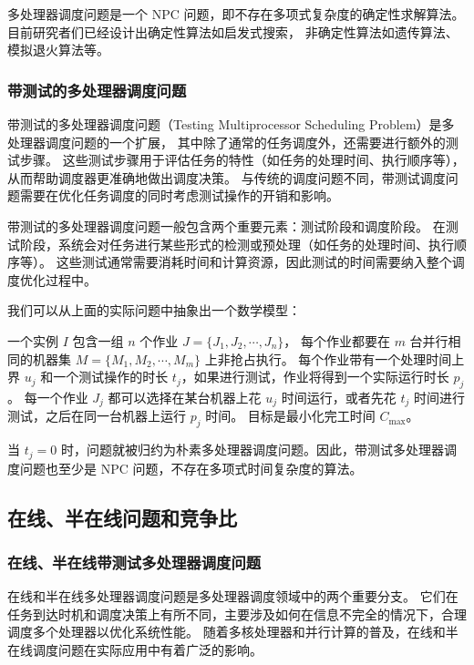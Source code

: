 多处理器调度问题是一个 NPC 问题，即不存在多项式复杂度的确定性求解算法。
目前研究者们已经设计出确定性算法如启发式搜索，
非确定性算法如遗传算法、模拟退火算法等。

\subsubsection{带测试的多处理器调度问题}

带测试的多处理器调度问题（Testing Multiprocessor Scheduling Problem）是多处理器调度问题的一个扩展，
其中除了通常的任务调度外，还需要进行额外的测试步骤。
这些测试步骤用于评估任务的特性（如任务的处理时间、执行顺序等），从而帮助调度器更准确地做出调度决策。
与传统的调度问题不同，带测试调度问题需要在优化任务调度的同时考虑测试操作的开销和影响。

带测试的多处理器调度问题一般包含两个重要元素：测试阶段和调度阶段。
在测试阶段，系统会对任务进行某些形式的检测或预处理（如任务的处理时间、执行顺序等）。
这些测试通常需要消耗时间和计算资源，因此测试的时间需要纳入整个调度优化过程中。

我们可以从上面的实际问题中抽象出一个数学模型：

\begin{defi}[带测试多处理器调度问题]
    一个实例 $I$ 包含一组 $n$ 个作业 $J = \{J_1, J_2, \cdots, J_n\}$，
    每个作业都要在 $m$ 台并行相同的机器集 $M = \{M_1, M_2, \cdots, M_m\}$ 上非抢占执行。
    每个作业带有一个处理时间上界 $u_j$ 和一个测试操作的时长 $t_j$，如果进行测试，作业将得到一个实际运行时长 $p_j$。
    每一个作业 $J_j$ 都可以选择在某台机器上花 $u_j$ 时间运行，或者先花 $t_j$ 时间进行测试，之后在同一台机器上运行 $p_j$ 时间。
    目标是最小化完工时间 $C_{\text{max}}$。
\end{defi}

当 $t_j=0$ 时，问题就被归约为朴素多处理器调度问题。因此，带测试多处理器调度问题也至少是 NPC 问题，不存在多项式时间复杂度的算法。

\subsection{在线、半在线问题和竞争比}

\subsubsection{在线、半在线带测试多处理器调度问题}

在线和半在线多处理器调度问题是多处理器调度领域中的两个重要分支。
它们在任务到达时机和调度决策上有所不同，主要涉及如何在信息不完全的情况下，合理调度多个处理器以优化系统性能。
随着多核处理器和并行计算的普及，在线和半在线调度问题在实际应用中有着广泛的影响。

